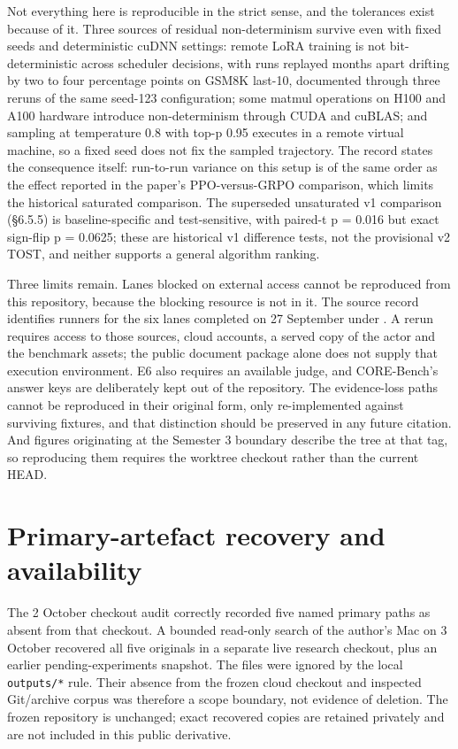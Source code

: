 \documentclass[12pt,a4paper]{report}
\DeclareRobustCommand{\longtok}[1]{\texttt{\seqsplit{#1}}}
\begin{document}
Not everything here is reproducible in the strict sense, and the
tolerances exist because of it. Three sources of residual
non-determinism survive even with fixed seeds and deterministic cuDNN
settings: remote LoRA training is not bit-deterministic across scheduler
decisions, with runs replayed months apart drifting by two to four
percentage points on GSM8K last-10, documented through three reruns of
the same seed-123 configuration; some matmul operations on H100 and A100
hardware introduce non-determinism through CUDA and cuBLAS; and sampling
at temperature 0.8 with top-p 0.95 executes in a remote virtual machine,
so a fixed seed does not fix the sampled trajectory. The record states
the consequence itself: run-to-run variance on this setup is of the same
order as the effect reported in the paper's PPO-versus-GRPO comparison,
which limits the historical saturated comparison. The superseded
unsaturated v1 comparison (§6.5.5) is baseline-specific and
test-sensitive, with paired-t p = 0.016 but exact sign-flip p = 0.0625;
these are historical v1 difference tests, not the provisional v2 TOST,
and neither supports a general algorithm ranking.

Three limits remain. Lanes blocked on external access cannot be
reproduced from this repository, because the blocking resource is not in
it. The source record identifies runners for the six lanes completed on
27 September under \longtok{outputs/finish\_\allowbreak{}pending\_\allowbreak{}2026-09-27/}. A
rerun requires access to those sources, cloud accounts, a served copy of
the actor and the benchmark assets; the public document package alone
does not supply that execution environment. E6 also requires an
available judge, and CORE-Bench's answer keys are deliberately kept out
of the repository. The evidence-loss paths cannot be reproduced in their
original form, only re-implemented against surviving fixtures, and that
distinction should be preserved in any future citation. And figures
originating at the Semester 3 boundary describe the tree at that tag, so
reproducing them requires the worktree checkout rather than the current
HEAD.

\section{Primary-artefact recovery and
availability}\label{primary-artefact-recovery-and-availability}

The 2 October checkout audit correctly recorded five named primary paths
as absent from that checkout. A bounded read-only search of the author's
Mac on 3 October recovered all five originals in a separate live
research checkout, plus an earlier pending-experiments snapshot. The
files were ignored by the local \texttt{outputs/*} rule. Their absence
from the frozen cloud checkout and inspected Git/archive corpus was
therefore a scope boundary, not evidence of deletion. The frozen
repository is unchanged; exact recovered copies are retained privately
and are not included in this public derivative.
\end{document}
